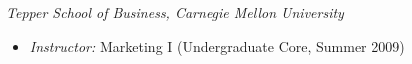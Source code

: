 \documentclass[margin, line, centered, 10pt]{res}
\begin{document}
\begin{resume}
\vspace{0.05in}
\textit{Tepper School of Business, Carnegie Mellon University}
\begin{itemize}
\item \textit{Instructor:} Marketing I (Undergraduate Core, Summer 2009)
\end{itemize}



%




\end{resume}
\end{document}
